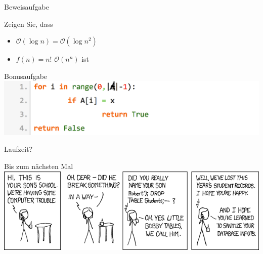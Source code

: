 \documentclass[18pt]{beamer}
\begin{document}
	\begin{frame}{Beweisaufgabe}
		\begin{exampleblock}{Zeigen Sie, dass}
			\begin{itemize}
				\item $ \mathcal{O}( \log{n}) = \mathcal{O}( \log{n ^{2}} ) $
				\item $ f(n) =  n! $ \in $ \mathcal{O} ( n ^{n}) $ ist
			\end{itemize}
		\end{exampleblock}
	\end{frame}


	\begin{frame}{Bonusaufgabe}
		\includegraphics[align=center, scale=0.25]{pics/pseudocode02.png}
		


		Laufzeit?	
	\end{frame}

	\begin{frame}{Bis zum nächsten Mal}
		\includegraphics[align=center, scale=0.5]{pics/exploits_of_a_mom.png}
	\end{frame}
\end{document}
